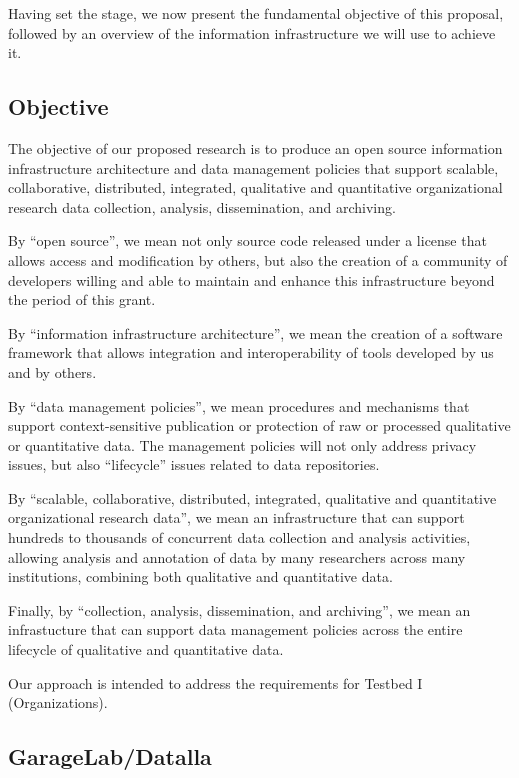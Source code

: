 Having set the stage, we now present the fundamental objective of this
proposal, followed by an overview of the information infrastructure
we will use to achieve it.

\subsection{Objective}

The objective of our proposed research is to produce an open source
information infrastructure architecture and data management policies that
support scalable, collaborative, distributed, integrated, qualitative and
quantitative organizational research data collection, analysis,
dissemination, and archiving.

By ``open source'', we mean not only source code released under a license
that allows access and modification by others, but also the creation of a
community of developers willing and able to maintain and enhance this 
infrastructure beyond the period of this grant. 

By ``information infrastructure architecture'', we mean the creation of a
software framework that allows integration and interoperability of tools
developed by us and by others.  

By ``data management policies'', we mean procedures and mechanisms that
support context-sensitive publication or protection of raw or processed
qualitative or quantitative data.  The management policies will not only
address privacy issues, but also ``lifecycle'' issues related to data
repositories. 

By ``scalable, collaborative, distributed, integrated, qualitative and
quantitative organizational research data'', we mean an infrastructure that
can support hundreds to thousands of concurrent data collection and
analysis activities, allowing analysis and annotation of data by many
researchers across many institutions, combining both qualitative and
quantitative data.

Finally, by ``collection, analysis, dissemination, and archiving'', we mean
an  infrastucture that  can  support data  management  policies across  the
entire lifecycle of qualitative and quantitative data.

Our approach is intended to address the requirements for Testbed I (Organizations).

\subsection{GarageLab/Datalla}

